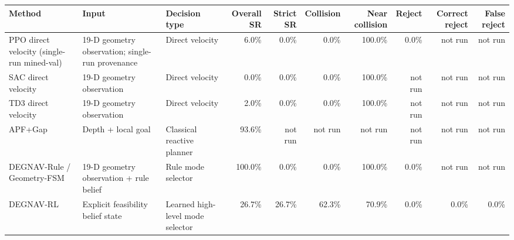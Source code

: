 \begin{tabular}{lllrrrrrrr}
\toprule
Method & Input & Decision type & Overall SR & Strict SR & Collision & Near collision & Reject & Correct reject & False reject \\
\midrule
PPO direct velocity (single-run mined-val) & 19-D geometry observation; single-run provenance & Direct velocity & 6.0\% & 0.0\% & 0.0\% & 100.0\% & 0.0\% & not run & not run \\
SAC direct velocity & 19-D geometry observation & Direct velocity & 0.0\% & 0.0\% & 0.0\% & 100.0\% & not run & not run & not run \\
TD3 direct velocity & 19-D geometry observation & Direct velocity & 2.0\% & 0.0\% & 0.0\% & 100.0\% & not run & not run & not run \\
APF+Gap & Depth + local goal & Classical reactive planner & 93.6\% & not run & not run & not run & not run & not run & not run \\
DEGNAV-Rule / Geometry-FSM & 19-D geometry observation + rule belief & Rule mode selector & 100.0\% & 0.0\% & 0.0\% & 100.0\% & 0.0\% & not run & not run \\
DEGNAV-RL & Explicit feasibility belief state & Learned high-level mode selector & 26.7\% & 26.7\% & 62.3\% & 70.9\% & 0.0\% & 0.0\% & 0.0\% \\
\bottomrule
\end{tabular}

